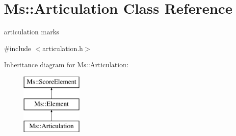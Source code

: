 \hypertarget{class_ms_1_1_articulation}{}\section{Ms\+:\+:Articulation Class Reference}
\label{class_ms_1_1_articulation}


articulation marks  




{\ttfamily \#include $<$articulation.\+h$>$}

Inheritance diagram for Ms\+:\+:Articulation\+:\begin{figure}[H]
\begin{center}
\leavevmode
\includegraphics[height=3.000000cm]{class_ms_1_1_articulation}
\end{center}
\end{figure}
